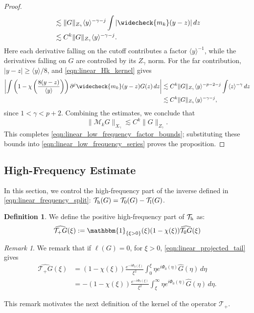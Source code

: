 \documentclass[11pt]{amsart}
\theoremstyle{definition}
\newtheorem{definition}[theorem]{Definition}
\theoremstyle{remark}
\newtheorem{remark}[theorem]{Remark}
\numberwithin{equation}{section}
\newcommand{\mc}[1]{\mathcal{#1}}
\newcommand{\ang}[1]{\langle #1 \rangle}
\begin{document}
\begin{proof}
\begin{align*}
        & \lesssim \|G\|_{Z_\gamma}\ang{y}^{-\gamma-j}\int |\widecheck{m_k}(y-z)|\,dz \\
        & \lesssim C^k\|G\|_{Z_\gamma}\ang{y}^{-\gamma-j}.
    \end{align*}
    Here each derivative falling on the cutoff contributes a factor $\ang{y}^{-1}$, while the derivatives falling on $G$ are controlled by its $Z_\gamma$ norm. For the far contribution, $|y-z| \geq \ang{y}/8$, and \eqref{eqn:linear_Hk_kernel} gives
    \begin{align*}
        \left|\int \left(1-\chi\left(\frac{8(y-z)}{\ang{y}}\right)\right)\partial^j\widecheck{m_k}(y-z)G(z)\,dz\right| & \lesssim C^k\|G\|_{Z_\gamma}\ang{y}^{-p-2-j}\int \ang{z}^{-\gamma}\,dz \\
        & \lesssim C^k\|G\|_{Z_\gamma}\ang{y}^{-\gamma-j},
    \end{align*}
    since $1 < \gamma < p+2$. Combining the estimates, we conclude that
    \begin{equation}\label{eqn:linear_Hk_bound}
        \|\mc{M}_kG\|_{X_\gamma} \lesssim C^k\|G\|_{Z_\gamma}.
    \end{equation}
    This completes \eqref{eqn:linear_low_frequency_factor_bounds}; substituting these bounds into \eqref{eqn:linear_low_frequency_series} proves the proposition.
\end{proof}

\subsection{High-Frequency Estimate}\label{sec:linear_high_frequency}

In this section, we control the high-frequency part of the inverse defined in \eqref{eqn:linear_frequency_split}: $\mc{T}_{\textup{h}}(G) = \mc{T}_0(G) - \mc{T}_{\textup{l}}(G)$.

\begin{definition}
    We define the positive high-frequency part of $\mc{T}_{\textup{h}}$ as:
    \[\widehat{\mc{T}_{+}G}(\xi) := \mathbbm{1}_{\{\xi > 0\}}(\xi)(1 - \chi(\xi)) \widehat{\mc{T}_{0}G}(\xi)\]
\end{definition}

\begin{remark}
    We remark that if $\ell(G) = 0$, for $\xi > 0$, \eqref{eqn:linear_projected_tail} gives 
    \begin{align*}
        \widehat{\mc{T}_{+}G}(\xi) & = (1 - \chi(\xi))\frac{e^{-i\Phi_0(\xi)}}{\xi^2}
        \int_0^\xi \eta e^{i\Phi_0(\eta)}\widehat G(\eta)\,d\eta \\
        & = -(1 - \chi(\xi))\frac{e^{-i\Phi_0(\xi)}}{\xi^2}
        \int_\xi^{\infty} \eta e^{i\Phi_0(\eta)}\widehat G(\eta)\,d\eta.
    \end{align*}
\end{remark}
This remark motivates the next definition of the kernel of the operator $\mc{T}_+$.
\end{document}
